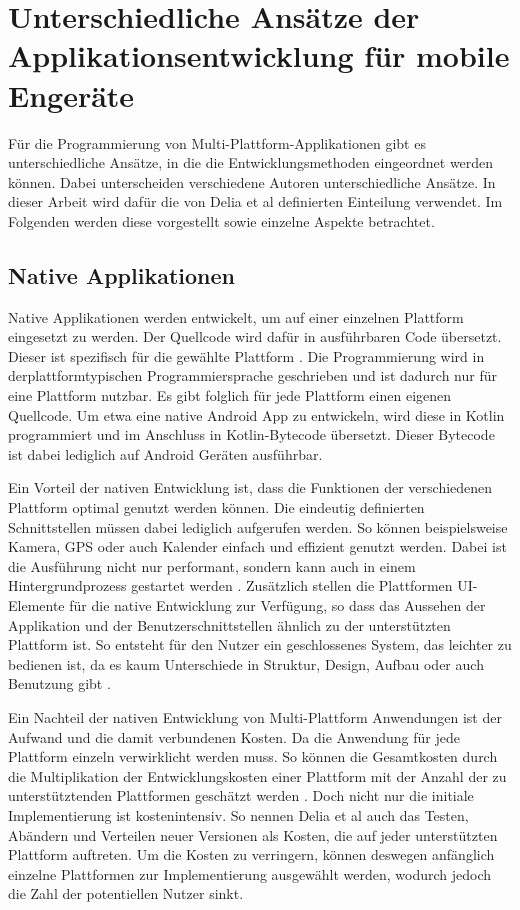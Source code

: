 \section{Unterschiedliche Ansätze der Applikationsentwicklung für mobile Engeräte}
\label{cha:3_2}
Für die Programmierung von Multi-Plattform-Applikationen gibt es unterschiedliche Ansätze, in die die Entwicklungsmethoden eingeordnet werden können. Dabei unterscheiden verschiedene Autoren unterschiedliche Ansätze. In dieser Arbeit wird dafür die von Delia et al \cite{IEEE_development_classes} definierten Einteilung verwendet. Im Folgenden werden diese vorgestellt sowie einzelne Aspekte betrachtet.

\subsection{Native Applikationen}
Native Applikationen werden entwickelt, um auf einer einzelnen Plattform eingesetzt zu werden. Der Quellcode wird dafür in ausführbaren Code übersetzt. Dieser ist spezifisch für die gewählte Plattform \cite{IEEE_development_classes}.
Die Programmierung wird in derplattformtypischen Programmiersprache geschrieben und ist dadurch nur für eine Plattform nutzbar. Es gibt folglich für jede Plattform einen eigenen Quellcode. Um etwa eine native Android App zu entwickeln, wird diese in Kotlin programmiert und im Anschluss in Kotlin-Bytecode übersetzt. Dieser Bytecode ist dabei lediglich auf Android Geräten ausführbar.

Ein Vorteil der nativen Entwicklung ist, dass die Funktionen der verschiedenen Plattform optimal genutzt werden können. Die eindeutig definierten Schnittstellen müssen dabei lediglich aufgerufen werden. So können beispielsweise Kamera, GPS oder auch Kalender einfach und effizient genutzt werden. Dabei ist die Ausführung nicht nur performant, sondern kann auch in einem Hintergrundprozess gestartet werden \cite{IEEE_development_classes}.
Zusätzlich stellen die Plattformen UI-Elemente für die native Entwicklung zur Verfügung, so dass das Aussehen der Applikation und der Benutzerschnittstellen ähnlich zu der unterstützten Plattform ist. So entsteht für den Nutzer ein geschlossenes System, das leichter zu bedienen ist, da es kaum Unterschiede in Struktur, Design, Aufbau oder auch Benutzung gibt \cite{IEEE_Khackouch_Al}.

Ein Nachteil der nativen Entwicklung von Multi-Plattform Anwendungen ist der Aufwand und die damit verbundenen Kosten. Da die Anwendung für jede Plattform einzeln verwirklicht werden muss. So können die Gesamtkosten durch die Multiplikation der Entwicklungskosten einer Plattform mit der Anzahl der zu unterstütztenden Plattformen geschätzt werden \cite{IEEE_Khackouch_Al}. Doch nicht nur die initiale Implementierung ist kostenintensiv. So nennen Delia et al \cite{IEEE_development_classes} auch das Testen, Abändern und Verteilen neuer Versionen als Kosten, die auf jeder unterstützten Plattform auftreten. 
Um die Kosten zu verringern, können deswegen anfänglich einzelne Plattformen zur Implementierung ausgewählt werden, wodurch jedoch die Zahl der potentiellen Nutzer sinkt.

